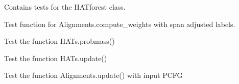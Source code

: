\documentclass[letterpaper,10pt,english]{sphinxmanual}
\begin{document}
\label{tests:module-tests_HATforest}

\begin{fulllineitems}
\label{tests:tests_HATforest.HATsTests}
Contains tests for the HATforest class.

\begin{fulllineitems}
\label{tests:tests_HATforest.HATsTests.grammar_test}
Test function for Alignments.compute\_weights with span adjusted labels.

\end{fulllineitems}


\begin{fulllineitems}
\label{tests:tests_HATforest.HATsTests.probs_test}
Test the function HATs.probmass()

\end{fulllineitems}


\begin{fulllineitems}
\label{tests:tests_HATforest.HATsTests.test_all}
\end{fulllineitems}


\begin{fulllineitems}
\label{tests:tests_HATforest.HATsTests.update_test}
Test the function HATs.update()

\end{fulllineitems}


\begin{fulllineitems}
\label{tests:tests_HATforest.HATsTests.update_test2}
Test the function Alignments.update() with input PCFG

\end{fulllineitems}


\end{fulllineitems}
\end{document}
